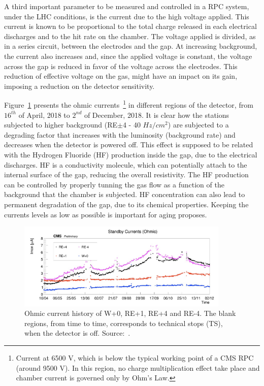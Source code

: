 A third important parameter to be measured and controlled in a RPC system, under the LHC conditions, is the current due to the high voltage applied. This current is known to be proportional to the total charge released in each electrical discharges and to the hit rate on the chamber. The voltage applied is divided, as in a series circuit, between the electrodes and the gap. At increasing background, the current also increases and, since the applied voltage is constant, the voltage across the gap is reduced in favor of the voltage across the electrodes. This reduction of effective voltage on the gas, might have an impact on its gain, imposing a reduction on the detector sensitivity.

Figure~\ref{cms_run2_currents} presents the ohmic currents~\footnote{Current at 6500 V, which is below the typical working point of a CMS RPC (around 9500 V). In this region, no charge multiplication effect take place and chamber current is governed only by Ohm's Law.} in different regions of the detector, from $16^{th}$ of April, 2018 to $2^{nd}$ of December, 2018. It is clear how the stations subjected to higher background (RE$\pm$4 - 40 $Hz/cm^2$) are subjected to a degrading factor that increases with the luminosity (background rate) and decreases when the detector is powered off. This effect is supposed to be related with the Hydrogen Fluoride (HF) production inside the gap, due to the electrical discharges. HF is a conductivity molecule, which can potentially attach to the internal surface of the gap, reducing the overall resistivity. The HF production can be controlled by properly tunning the gas flow as a function of the background that the chamber is subjected. HF concentration can also lead to permanent degradation of the gap, due to its chemical properties. Keeping the currents levels as low as possible is important for aging proposes. 

\begin{figure}[htbp]
    \centering
    \includegraphics[width=0.9\textwidth,keepaspectratio]{figures_and_tables/rpc/performance/ohmic_current_run2.png}
    \caption{Ohmic current history of W+0, RE+1, RE+4 and RE-4. The blank regions, from time to time, corresponds to technical stops (TS), when the detector is off. Source:~\cite{rpc_run2_performance}.}
    \label{cms_run2_currents}
\end{figure}

